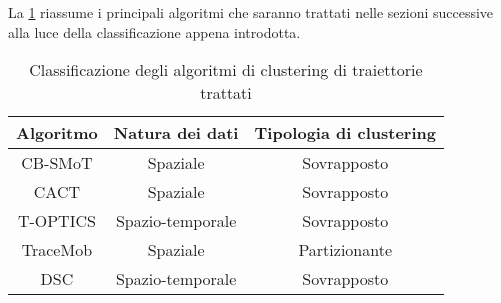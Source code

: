 La \cref{tab:clus-alg} riassume i principali algoritmi che saranno trattati nelle sezioni successive alla luce della classificazione appena introdotta.
\begin{table}[H]
    \centering
   \begin{tabular}{||c c c||}
 \hline
 Algoritmo & Natura dei dati & Tipologia di clustering \\ [0.5ex] 
 \hline\hline
CB-SMoT & Spaziale & Sovrapposto \\ 
 \hline
CACT & Spaziale & Sovrapposto \\ 
 \hline
T-OPTICS & Spazio-temporale & Sovrapposto \\
 \hline
TraceMob & Spaziale & Partizionante \\
 \hline
 DSC & Spazio-temporale & Sovrapposto \\
 \hline

\end{tabular}
    \caption{Classificazione degli algoritmi di clustering di traiettorie trattati}
    \label{tab:clus-alg}
\end{table}

\begin{center}

\end{center}
